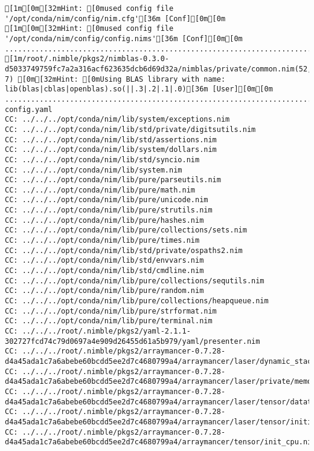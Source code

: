 \begin{verbatim}
[1m[0m[32mHint: [0mused config file '/opt/conda/nim/config/nim.cfg'[36m [Conf][0m[0m
[1m[0m[32mHint: [0mused config file '/opt/conda/nim/config/config.nims'[36m [Conf][0m[0m
...........................................................................................................................................................
[1m/root/.nimble/pkgs2/nimblas-0.3.0-d5033749759fc7a2a316acf623635dcb6d69d32a/nimblas/private/common.nim(52, 7) [0m[32mHint: [0mUsing BLAS library with name: lib(blas|cblas|openblas).so(||.3|.2|.1|.0)[36m [User][0m[0m
...........................................................................
config.yaml
CC: ../../../opt/conda/nim/lib/system/exceptions.nim
CC: ../../../opt/conda/nim/lib/std/private/digitsutils.nim
CC: ../../../opt/conda/nim/lib/std/assertions.nim
CC: ../../../opt/conda/nim/lib/system/dollars.nim
CC: ../../../opt/conda/nim/lib/std/syncio.nim
CC: ../../../opt/conda/nim/lib/system.nim
CC: ../../../opt/conda/nim/lib/pure/parseutils.nim
CC: ../../../opt/conda/nim/lib/pure/math.nim
CC: ../../../opt/conda/nim/lib/pure/unicode.nim
CC: ../../../opt/conda/nim/lib/pure/strutils.nim
CC: ../../../opt/conda/nim/lib/pure/hashes.nim
CC: ../../../opt/conda/nim/lib/pure/collections/sets.nim
CC: ../../../opt/conda/nim/lib/pure/times.nim
CC: ../../../opt/conda/nim/lib/std/private/ospaths2.nim
CC: ../../../opt/conda/nim/lib/std/envvars.nim
CC: ../../../opt/conda/nim/lib/std/cmdline.nim
CC: ../../../opt/conda/nim/lib/pure/collections/sequtils.nim
CC: ../../../opt/conda/nim/lib/pure/random.nim
CC: ../../../opt/conda/nim/lib/pure/collections/heapqueue.nim
CC: ../../../opt/conda/nim/lib/pure/strformat.nim
CC: ../../../opt/conda/nim/lib/pure/terminal.nim
CC: ../../../root/.nimble/pkgs2/yaml-2.1.1-302727fcd74c79d0697a4e909d26455d61a5b979/yaml/presenter.nim
CC: ../../../root/.nimble/pkgs2/arraymancer-0.7.28-d4a45ada1c7a6abebe60bcdd5ee2d7c4680799a4/arraymancer/laser/dynamic_stack_arrays.nim
CC: ../../../root/.nimble/pkgs2/arraymancer-0.7.28-d4a45ada1c7a6abebe60bcdd5ee2d7c4680799a4/arraymancer/laser/private/memory.nim
CC: ../../../root/.nimble/pkgs2/arraymancer-0.7.28-d4a45ada1c7a6abebe60bcdd5ee2d7c4680799a4/arraymancer/laser/tensor/datatypes.nim
CC: ../../../root/.nimble/pkgs2/arraymancer-0.7.28-d4a45ada1c7a6abebe60bcdd5ee2d7c4680799a4/arraymancer/laser/tensor/initialization.nim
CC: ../../../root/.nimble/pkgs2/arraymancer-0.7.28-d4a45ada1c7a6abebe60bcdd5ee2d7c4680799a4/arraymancer/tensor/init_cpu.nim

\end{verbatim}
